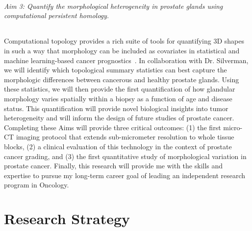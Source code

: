 \documentclass{NIHGrant}
\theoremstyle{theorem}
\begin{document}
\paragraph*{Aim 3: Quantify the morphological heterogeneity in prostate glands using computational persistent homology.}
Computational topology provides a rich suite of tools for quantifying 3D shapes in such a way that morphology can be included as covariates in statistical and machine learning-based cancer prognostics~\cite{primakov_automated_2022,crawford_predicting_2020}. In collaboration with Dr. Silverman, we will identify which topological summary statistics can best capture the morphologic differences between cancerous and healthy prostate glands. Using these statistics, we will then provide the first quantification of how glandular morphology varies spatially within a biopsy as a function of age and disease status. This quantification will provide novel biological insights into tumor heterogeneity and will inform the design of future studies of prostate cancer.  \\[5pt]
%
\noindent
Completing these Aims will provide three critical outcomes: (1) the first micro-CT imaging protocol that extends sub-micrometer resolution to whole tissue blocks, (2) a clinical evaluation of this technology in the context of prostate cancer grading, and (3) the first quantitative study of morphological variation in prostate cancer. Finally, this research will provide me with the skills and expertise to pursue my long-term career goal of leading an independent research program in Oncology.

\newpage
\part*{Research Strategy}
\end{document}
